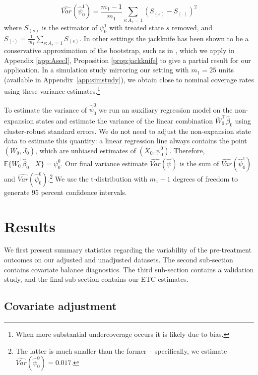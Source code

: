 \documentclass[aoas]{imsart}
\theoremstyle{plain}
\theoremstyle{remark}
\begin{document}
\begin{equation}\label{eqn:jackknife}
 \hat{Var}(\hat{\psi}_0^1) = \frac{m_1 - 1}{m_1} \sum_{s:A_s = 1} \left( S_{(s)} - S_{(\cdot)} \right)^2
\end{equation}
%
where $S_{(s)}$ is the estimator of $\psi_0^1$ with treated state $s$ removed, and $S_{(\cdot)} = \frac{1}{m_1} \sum_{s:A_s=1} S_{(s)}$. In other settings the jackknife has been shown to be a conservative approximation of the bootstrap, such as in \cite{efron1981jackknife}, which we apply in Appendix \ref{app:AsecI}, Proposition \ref{prop:jackknife} to give a partial result for our application. In a simulation study mirroring our setting with $m_1 = 25$ units (available in Appendix~\ref{app:simstudy}), we obtain close to nominal coverage rates using these variance estimates.\footnote{When more substantial undercoverage occurs it is likely due to bias.}

To estimate the variance of $\hat{\psi}_0^0$ we run an auxiliary regression model on the non-expansion states and estimate the variance of the linear combination $\bar{W}_0^\top\hat{\beta}_0$ using cluster-robust standard errors. We do not need to adjust the non-expansion state data to estimate this quantity: a linear regression line always contains the point $(\bar{W}_0, \bar{J}_0)$, which are unbiased estimates of $(\bar{X}_0, \psi_0^0)$. Therefore, $\mathbb{E}\{\bar{W}_0^\top\hat{\beta}_0 \mid X\} = \psi_0^0$. Our final variance estimate $\hat{Var}(\hat{\psi})$ is the sum of $\hat{Var}(\hat{\psi}_0^1)$ and $\hat{Var}(\hat{\psi}_0^0)$.\footnote{The latter is much smaller than the former -- specifically, we estimate $\hat{Var}(\hat{\psi}_0^0) = 0.017$.} We use the t-distribution with $m_1 - 1$ degrees of freedom to generate 95 percent confidence intervals.

\section{Results}\label{sec:results}

We first present summary statistics regarding the variability of the pre-treatment outcomes on our adjusted and unadjusted datasets. The second sub-section contains covariate balance diagnostics. The third sub-section contains a validation study, and the final sub-section contains our ETC estimates.

\subsection{Covariate adjustment}
\end{document}
